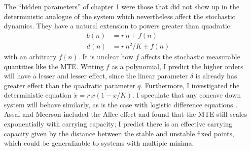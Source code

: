 The ``hidden parameters'' of chapter 1 were those that did not show up in the deterministic analogue of the system which nevertheless affect the stochastic dynamics. %
They have a natural extension to powers greater than quadratic:
\begin{align*}
	b(n) &= r\,n + f(n) \\
	d(n) &= r\,n^2/K + f(n)
\end{align*}
with an arbitrary $f(n)$. 
It is unclear how $f$ affects the stochastic measurable quantities like the MTE. 
Writing $f$ as a polynomial, I predict the higher orders will have a lesser and lesser effect, since the linear parameter $\delta$ is already has greater effect than the quadratic parameter $q$. 
Furthermore, I investigated the deterministic equation $\dot{x} = r\,x(1-x/K)$. I speculate that any concave down system will behave similarly, as is the case with logistic difference equations \cite{Strogatz1994}. 
Assaf and Meerson \cite{Assaf2016} included the Allee effect and found that the MTE still scales exponentially with carrying capacity; I predict there is an effective carrying capacity given by the distance between the stable and unstable fixed points, which could be generalizable to systems with multiple minima. 

